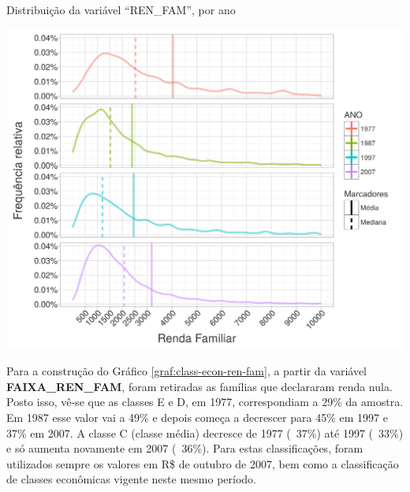 \begin{grafico}[htb]%
    \caption{\label{graf:freq-rel-ren-fam}Distribuição da variável ``REN_FAM'', por ano}%
    \begin{center}%
        \includegraphics[width=1\textwidth]{./imagens/freq-rel-ren-fam.png}%
    \end{center}%
\end{grafico}%

Para a construção do Gráfico \ref{graf:class-econ-ren-fam}, a partir da variável \textbf{FAIXA_REN_FAM}, foram retiradas as famílias que declararam renda nula. Posto isso, vê-se que as classes E e D, em 1977, correspondiam a 29\% da amostra. Em 1987 esse valor vai a 49\% e depois começa a decrescer para 45\% em 1997 e 37\% em 2007. A classe C (classe média) decresce de 1977 (~37\%) até 1997 (~33\%) e só aumenta novamente em 2007 (~36\%). Para estas classificações, foram utilizados sempre os valores em R\$ de outubro de 2007, bem como a classificação de classes econômicas vigente neste mesmo período.

